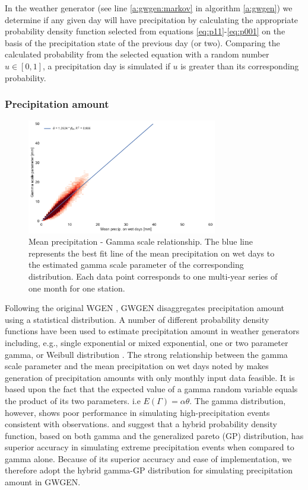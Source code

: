 \begin{refsection}
In the weather generator (see line \ref{a:gwgen:markov} in algorithm \ref{a:gwgen}) we determine if any given day will have precipitation by calculating the appropriate probability density function selected from  equations \eqref{eq:p11}-\eqref{eq:p001} on the basis of the precipitation state of the previous day (or two). Comparing the calculated probability from the selected equation with a random number $u\in[0, 1]$, a precipitation day is simulated if $u$ is greater than its corresponding probability.

\subsubsection{Precipitation amount} \label{sec:dist_params}

\begin{figure}
	\includegraphics[width=8.3cm]{gwgen-figures/f04.pdf}
	\caption[Mean precipitation - Gamma scale relationship]{Mean precipitation - Gamma scale relationship. The blue line represents the best fit line of the mean precipitation on wet days to the estimated gamma scale parameter of the corresponding distribution. Each data point corresponds to one multi-year series of one month for one station.}
	\label{fig:gscale_meanw}
\end{figure}

Following the original WGEN \citep{Richardson1981}, GWGEN disaggregates precipitation amount using a statistical distribution. A number of different probability density functions have been used to estimate precipitation amount in weather generators including, e.g., single exponential or mixed exponential, one or two parameter gamma, or Weibull distribution \citep{WilksWilby1999}. The strong relationship between the gamma scale parameter and the mean precipitation on wet days noted by \cite{GengDevriesSupit1986} makes generation of precipitation amounts with only monthly input data feasible. It is based upon the fact that the expected value of a gamma random variable equals the product of its two parameters. i.e $E(\Gamma) = \alpha\theta$. The gamma distribution, however, shows poor performance in simulating high-precipitation events consistent with observations. \cite{FurrerKatz2008} and \cite{NeykovNeytchevZucchini2014} suggest that a hybrid probability density function, based on both gamma and the generalized pareto (GP) distribution, has superior accuracy in simulating extreme precipitation events when compared to gamma alone. Because of its superior accuracy and ease of implementation, we therefore adopt the hybrid gamma-GP distribution for simulating precipitation amount in GWGEN.


\end{refsection}
